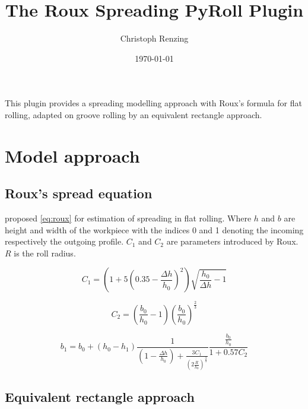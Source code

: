 \documentclass[11pt]{PyRollDocs}
\begin{document}
    \title{The Roux Spreading PyRoll Plugin}
    \author{Christoph Renzing}
    \date{\today}

    \maketitle

    This plugin provides a spreading modelling approach with Roux's formula for flat rolling, adapted on groove rolling by an equivalent rectangle approach.


    \section{Model approach}\label{sec:model-approach}

    \subsection{Roux's spread equation}\label{subsec:roux's-spread-equation}

    \textcite{} proposed \autoref{eq:roux} for estimation of spreading in flat rolling.
    Where $h$ and $b$ are height and width of the workpiece with the indices 0 and 1 denoting the incoming respectively the outgoing profile.
    $C_1$ and $C_2$ are parameters introduced by Roux.
    $R$ is the roll radius.


    \begin{equation}
        C_1 = \left( 1 + 5 \left( 0.35 - \frac{\Delta h}{h_0}\right)^2 \right) \sqrt{\frac{h_0}{\Delta h} - 1}
        \label{eq:roux-parameter-c1}
    \end{equation}

    \begin{equation}
        C_2 = \left( \frac{b_0}{h_0} - 1 \right) \left( \frac{b_0}{h_0} \right)^{\frac{2}{3}}
        \label{eq:roux-parameter-c2}
    \end{equation}

    \begin{equation}
        b_1 = b_0 + \left( h_0 - h_1 \right) \frac{1}{\left( 1 - \frac{\Delta h}{h_0} \right) + \frac{3 C_1}{\left( 2 \frac{R}{h_0} \right)^{\frac{3}{4}}}} \frac{\frac{b_0}{h_0}}{1 + 0.57 C_2}
        \label{eq:roux}
    \end{equation}

    \subsection{Equivalent rectangle approach}\label{subsec:equivalent-rectangle-approach}
\end{document}
